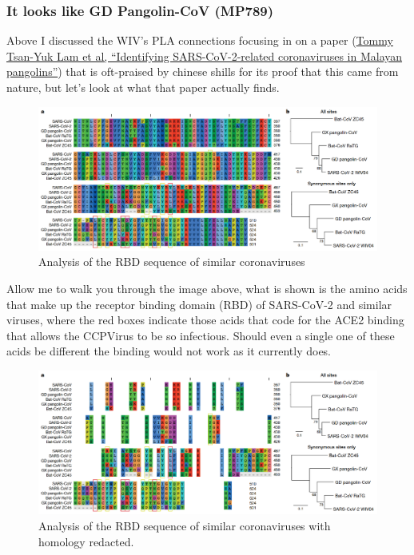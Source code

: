 \documentclass[11pt]{article}
\begin{document}
\subsubsection{It looks like GD Pangolin-CoV (MP789)}
\label{sec:org4e2c9a0}
Above I discussed the WIV's PLA connections focusing in on a paper (\href{https://www.nature.com/articles/s41586-020-2169-0.pdf}{Tommy Tsan-Yuk Lam et al, ``Identifying SARS-CoV-2-related coronaviruses in Malayan pangolins''}) that is oft-praised by chinese shills for its proof that this came from nature, but let's look at what that paper actually finds.

\begin{figure}[htbp]
\centering
\includegraphics[width=.9\linewidth]{./images/rbd-comp-0.png}
\caption{Analysis of the RBD sequence of similar coronaviruses}
\end{figure}

Allow me to walk you through the image above, what is shown is the amino acids that make up the receptor binding domain (RBD) of SARS-CoV-2 and similar viruses, where the red boxes indicate those acids that code for the ACE2 binding that allows the CCPVirus to be so infectious. Should even a single one of these acids be different the binding would not work as it currently does.

\begin{figure}[htbp]
\centering
\includegraphics[width=.9\linewidth]{./images/rbd-comp-1.png}
\caption{Analysis of the RBD sequence of similar coronaviruses with homology redacted.}
\end{figure}
\end{document}

